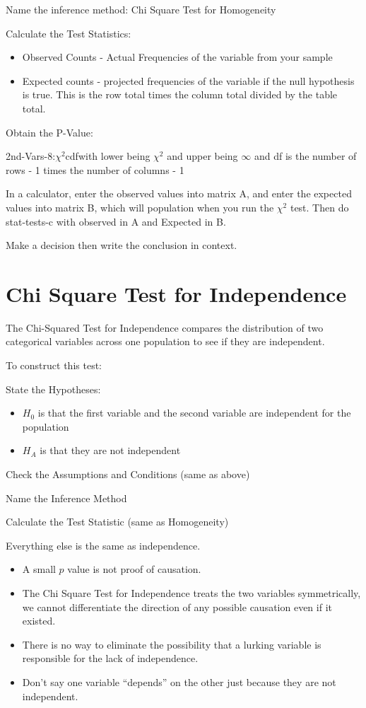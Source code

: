 \documentclass[../stats.tex]{subfiles}
\begin{document}
Name the inference method: Chi Square Test for Homogeneity

Calculate the Test Statistics:
\begin{itemize}
    \item Observed Counts - Actual Frequencies of the variable from your sample 
    \item Expected counts - projected frequencies of the variable if the null hypothesis is true. This is the row total times the column total divided by the table total.
\end{itemize}

Obtain the P-Value: 

2nd-Vars-8:$\chi^2$cdfwith lower being $\chi^2$ and upper being $\infty$ and df is the number of rows - 1 times the number of columns - 1

In a calculator, enter the observed values into matrix A, and enter the expected values into matrix B, which will population when you run the $\chi^2$ test. Then do stat-tests-c with observed in A and Expected in B.

Make a decision then write the conclusion in context.

\section{Chi Square Test for Independence}
The Chi-Squared Test for Independence compares the distribution of two categorical variables across one population to see if they are independent.

To construct this test:

State the Hypotheses:
\begin{itemize}
    \item $H_0$ is that the first variable and the second variable are independent for the population 
    \item $H_A$ is that they are not independent
\end{itemize}

Check the Assumptions and Conditions (same as above)

Name the Inference Method 

Calculate the Test Statistic (same as Homogeneity)

Everything else is the same as independence.

\begin{itemize}
    \item A small $p$ value is not proof of causation.
    \item The Chi Square Test for Independence treats the two variables symmetrically, we cannot differentiate the direction of any possible causation even if it existed.
    \item There is no way to eliminate the possibility that a lurking variable is responsible for the lack of independence.
    \item Don't say one variable ``depends'' on the other just because they are not independent.
\end{itemize}
\end{document}
